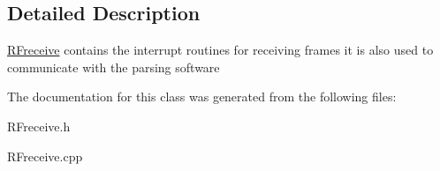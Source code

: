 \subsection{Detailed Description}
\mbox{\hyperlink{class_r_freceive}{R\+Freceive}} contains the interrupt routines for receiving frames it is also used to communicate with the parsing software 

The documentation for this class was generated from the following files\+:\begin{DoxyCompactItemize}
\item 
R\+Freceive.\+h\item 
R\+Freceive.\+cpp\end{DoxyCompactItemize}
